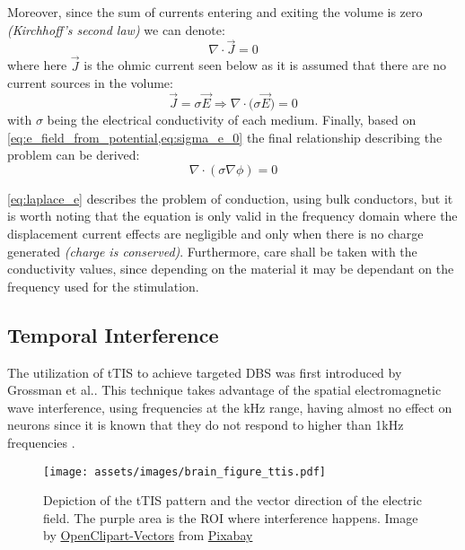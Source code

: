 \noindent Moreover, since the sum of currents entering and exiting the volume is zero \textit{(Kirchhoff's second law)} we can denote:
\begin{equation}
    \nabla\cdot\vec{J} = 0
\end{equation}
where here $\vec{J}$ is the ohmic current seen below as it is assumed that there are no current sources in the volume:
\begin{equation}
    \label{eq:sigma_e_0}
    \vec{J} = \sigma\vec{E}\Rightarrow\boxed{\nabla\cdot\big(\sigma\vec{E}\big) = 0}
\end{equation}
with $\sigma$ being the electrical conductivity of each medium. Finally, based on \cref{eq:e_field_from_potential,eq:sigma_e_0} the final relationship describing the problem can be derived:
\begin{equation}
    \label{eq:laplace_e}
    \boxed{\nabla\cdot(\sigma\nabla\phi) = 0}
\end{equation}

\autoref{eq:laplace_e} describes the problem of conduction, using bulk conductors, but it is worth noting that the equation is only valid in the frequency domain where the displacement current effects are negligible and only when there is no charge generated \textit{(charge is conserved)}. Furthermore, care shall be taken with the conductivity values, since depending on the material it may be dependant on the frequency used for the stimulation.

\pagebreak
\subsection{Temporal Interference}
The utilization of \gls{tTIS} to achieve targeted \gls{DBS} was first introduced by Grossman et al.\cite{Grossman2017}. This technique takes advantage of the spatial electromagnetic wave interference, using frequencies at the \si{kHz} range, having almost no effect on neurons since it is known that they do not respond to higher than 1\si{kHz} frequencies \cite{Hutcheon2000}.
\\\vspace{1pt}

\begin{wrapfigure}{r}{0.48\textwidth}
    \vspace{-10pt}
    \centering
    \texttt{[image: assets/images/brain\_figure\_ttis.pdf]}
    \caption[Depiction of the \gls{tTIS} pattern and the vector direction of the electric field. The purple area is the \gls{ROI} where interference happens.]{Depiction of the \gls{tTIS} pattern and the vector direction of the electric field. The purple area is the \gls{ROI} where interference happens. Image by \href{https://pixabay.com/users/openclipart-vectors-30363/?utm_source=link-attribution&amp;utm_medium=referral&amp;utm_campaign=image&amp;utm_content=150935}{OpenClipart-Vectors} from \href{https://pixabay.com/?utm_source=link-attribution&amp;utm_medium=referral&amp;utm_campaign=image&amp;utm_content=150935}{Pixabay}}
    \label{fig:brain_elec_demo}
\end{wrapfigure}

